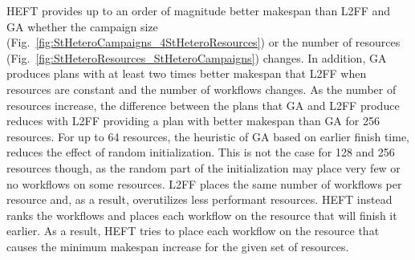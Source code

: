 HEFT provides up to an order of magnitude better makespan than L2FF and GA
whether the campaign size (Fig.~\ref{fig:StHeteroCampaigns_4StHeteroResources})
or the number of resources (Fig.~\ref{fig:StHeteroResources_StHeteroCampaigns})
changes. In addition, GA produces plans with at least two times better makespan
that L2FF when resources are constant and the number of workflows changes. As
the number of resources increase, the difference between the plans that GA and
L2FF produce reduces with L2FF providing a plan with better makespan than GA for
256 resources. For up to 64 resources, the heuristic of GA based on earlier
finish time, reduces the effect of random initialization. This is not the
case for 128 and 256 resources though, as the random part of the initialization
may place very few or no workflows on some resources. L2FF places the same
number of workflows per resource and, as a result, overutilizes less performant
resources. HEFT instead ranks the workflows and places each workflow on the
resource that will finish it earlier. As a result, HEFT tries to place each
workflow on the resource that causes the minimum makespan increase for the given
set of resources.

